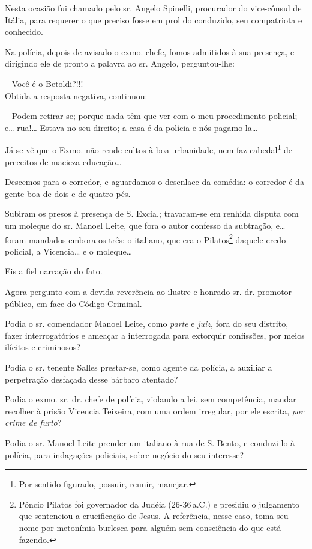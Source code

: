 {\begin{flushright}
Nesta ocasião fui chamado pelo sr. Angelo Spinelli, procurador do
vice-cônsul de Itália, para requerer o que preciso fosse em prol do
conduzido, seu compatriota e conhecido.

Na polícia, depois de avisado o exmo. chefe, fomos admitidos à sua
presença, e dirigindo ele de pronto a palavra ao sr. Angelo,
perguntou-lhe:

-- Você é o Betoldi?!!!\\
Obtida a resposta negativa, continuou:

-- Podem retirar-se; porque nada têm que ver com o meu procedimento
policial; e\ldots{} rua!\ldots{} Estava no seu direito; a casa é da polícia e nós
pagamo-la\ldots{}

Já se vê que o Exmo. não rende cultos à boa urbanidade, nem faz
cabedal\footnote{ Por sentido figurado, possuir, reunir, manejar.} de
preceitos de macieza educação\ldots{}

Descemos para o corredor, e aguardamos o desenlace da comédia: o
corredor é da gente boa de dois e de quatro pés.

Subiram os presos à presença de S. Excia.; travaram-se em renhida
disputa com um moleque do sr. Manoel Leite, que fora o autor confesso da
subtração, e\ldots{} foram mandados embora os três: o italiano, que era o
Pilatos\footnote{ Pôncio Pilatos foi governador da Judéia (26-36\,a.C.) e
  presidiu o julgamento que sentenciou a crucificação de Jesus. A
  referência, nesse caso, toma seu nome por metonímia burlesca para
  alguém sem consciência do que está fazendo.} daquele credo policial, a
Vicencia\ldots{} e o moleque\ldots{}

Eis a fiel narração do fato.

Agora pergunto com a devida reverência ao ilustre e honrado sr. dr.
promotor público, em face do Código Criminal.

Podia o sr. comendador Manoel Leite, como \emph{parte} e \emph{juiz},
fora do seu distrito, fazer interrogatórios e ameaçar a interrogada para
extorquir confissões, por meios ilícitos e criminosos?

Podia o sr. tenente Salles prestar-se, como agente da polícia, a
auxiliar a perpetração desfaçada desse bárbaro atentado?

Podia o exmo. sr. dr. chefe de polícia, violando a lei, sem competência,
mandar recolher à prisão Vicencia Teixeira, com uma ordem irregular, por
ele escrita, \emph{por crime de furto}?

Podia o sr. Manoel Leite prender um italiano à rua de S. Bento, e
conduzi-lo à polícia, para indagações policiais, sobre negócio do seu
interesse?


\end{flushright}}
